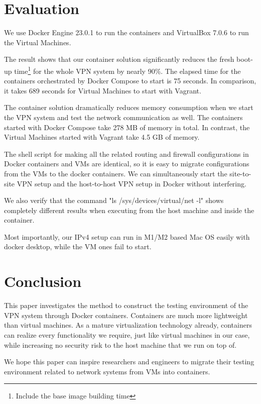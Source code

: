 \documentclass[article]{aaltoseries}
\begin{document}
\section{Evaluation}

We use Docker Engine 23.0.1 to run the containers and VirtualBox 7.0.6 to run the Virtual Machines.

The result shows that our container solution significantly reduces the fresh boot-up time\footnote{Include the base image building time} for the whole VPN system by nearly 90\%. The elapsed time for the containers orchestrated by Docker Compose to start is 75 seconds. In comparison, it takes 689 seconds for Virtual Machines to start with Vagrant.

The container solution dramatically reduces memory consumption when we start the VPN system and test the network communication as well. The containers started with Docker Compose take 278 MB of memory in total. In contrast, the Virtual Machines started with Vagrant take 4.5 GB of memory.

The shell script for making all the related routing and firewall configurations in Docker containers and VMs are identical, so it is easy to migrate configurations from the VMs to the docker containers. We can simultaneously start the site-to-site VPN setup and the host-to-host VPN setup in Docker without interfering.

We also verify that the command "ls /sys/devices/virtual/net -l" shows completely different results when executing from the host machine and inside the container.

Most importantly, our IPv4 setup can run in M1/M2 based Mac OS easily with docker desktop, while the VM ones fail to start.



\section{Conclusion}

This paper investigates the method to construct the testing environment of the VPN system through Docker containers. Containers are much more lightweight than virtual machines. As a mature virtualization technology already, containers can realize every functionality we require, just like virtual machines in our case, while increasing no security risk to the host machine that we run on top of.

We hope this paper can inspire researchers and engineers to migrate their testing environment related to network systems from VMs into containers.
\end{document}
